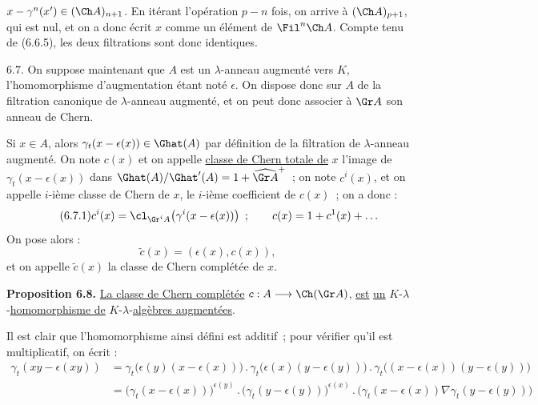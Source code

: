 
\(x-\gamma^n(x')\in(\Ch A)_{n+1}\). En
itérant l'opération \(p-n\) fois, on arrive à \((\Ch A)_{p+1}\), qui est nul, et on a donc écrit \(x\) comme un élément de \(\Fil^n\Ch A\). Compte tenu de (6.6.5), les deux filtrations sont donc identiques.

6.7. On suppose maintenant que \(A\) est un \(\lambda\)-anneau augmenté vers \(K\), l'homomorphisme d'augmentation étant noté \(\epsilon\). On dispose donc sur \(A\) de la filtration canonique de \(\lambda\)-anneau augmenté, et on peut donc associer à \(\Gr A\) son anneau de Chern.

Si \(x\in A\), alors \(\gamma_t(x-\epsilon(x))\in\Ghat(A)\) par définition de la filtration de \(\lambda\)-anneau augmenté. On note \(c(x)\) et on appelle \uline{classe de Chern totale de} \(x\) l'image de \(\gamma_t(x-\epsilon(x))\) dans \(\Ghat(A)/\Ghat'(A)=1+\widehat{\Gr A}^{+}\)~; on note \(c^i(x)\), et on appelle \(i\)-ième classe de Chern de \(x\), le \(i\)-ième coefficient de \(c(x)\)~; on a donc :
\begin{equation}\tag{6.7.1}
  c^i(x)=\cl_{\Gr^iA}\!\left(\gamma^i(x-\epsilon(x))\right)~;\qquad
  c(x)=1+c^1(x)+\ldots
\end{equation}
On pose alors :
\begin{equation}\tag{6.7.2}
  \widetilde c(x)=(\epsilon(x),c(x)),
\end{equation}
et on appelle \(\widetilde c(x)\) la classe de Chern complétée de \(x\).

\textbf{Proposition 6.8.} \uline{La classe de Chern complétée} \(c:A\longrightarrow\Ch(\Gr A)\), \uline{est} \uline{un} \(K\)-\(\lambda\)-\uline{homomorphisme de} \(K\)-\(\lambda\)-\uline{algèbres augmentées}.

Il est clair que l'homomorphisme ainsi défini est additif~; pour vérifier qu'il est multiplicatif, on écrit :
\[
\begin{aligned}
\gamma_t(xy-\epsilon(xy))
&=\gamma_t\bigl(\epsilon(y)(x-\epsilon(x))\bigr)\mathbin{.}
  \gamma_t\bigl(\epsilon(x)(y-\epsilon(y))\bigr)\mathbin{.}
  \gamma_t\bigl((x-\epsilon(x))(y-\epsilon(y))\bigr)\\
&=\bigl(\gamma_t(x-\epsilon(x))\bigr)^{\epsilon(y)}\mathbin{.}
  \bigl(\gamma_t(y-\epsilon(y))\bigr)^{\epsilon(x)}\mathbin{.}
  \bigl(\gamma_t(x-\epsilon(x))\nabla\gamma_t(y-\epsilon(y))\bigr)
\end{aligned}
\]
